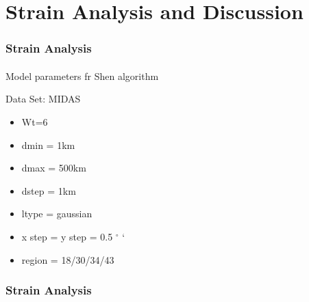 \section{Strain Analysis and Discussion}
 
\graphicspath{{Chapter4/Figs/}}

\begin{frame}
 \frametitle{Strain Analysis}
 \framesubtitle{}
 \label{ch4:}
 
  Model parameters fr Shen algorithm
  
  Data Set: MIDAS
  \begin{itemize}
    \item Wt=6
    \item dmin = 1km
    \item dmax = 500km
    \item dstep = 1km
    \item ltype = gaussian
    \item x step = y step = 0.5 $^{\circ}$
  `\item region = 18/30/34/43
  \end{itemize}

\end{frame}
\note{}

\begin{frame}
 \frametitle{Strain Analysis}
 \framesubtitle{}
 \label{ch4:}


\end{frame}
\note{}


